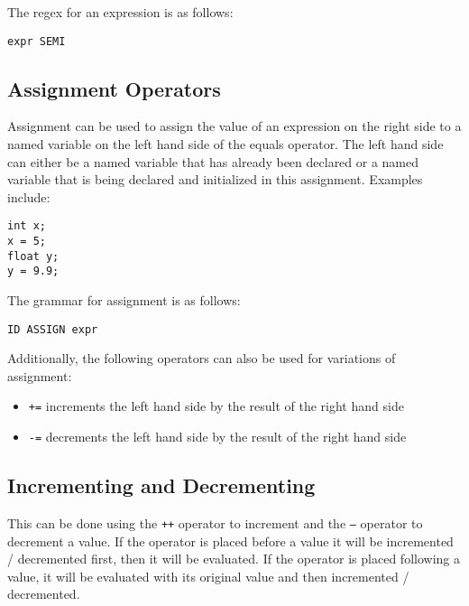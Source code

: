 \documentclass{article}
\begin{document}
The regex for an expression is as follows:
\begin{Verbatim}[frame=single]
expr SEMI
\end{Verbatim}

\subsection{Assignment Operators}
Assignment can be used to assign the value of an expression on the right side to a named variable on the left hand side of the equals operator.  The left hand side can either be a named variable that has already been declared or a named variable that is being declared and initialized in this assignment.  Examples include:
\begin{lstlisting}
int x;
x = 5;
float y;
y = 9.9;
\end{lstlisting}

The grammar for assignment is as follows:
\begin{Verbatim}[frame=single]
ID ASSIGN expr
\end{Verbatim}

Additionally, the following operators can also be used for variations of assignment:

\begin{itemize}
\item \texttt{+=} increments the left hand side by the result of the right hand side
\item \texttt{-=} decrements the left hand side by the result of the right hand side
\end{itemize}

\subsection{Incrementing and Decrementing}
This can be done using the \texttt{++} operator to increment and the \texttt{--} operator to decrement a value.  If the operator is placed before a value it will be incremented / decremented first, then it will be evaluated.  If the operator is placed following a value, it will be evaluated with its original value and then incremented / decremented.
\end{document}
